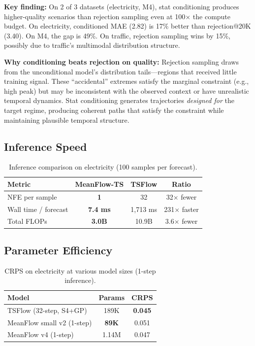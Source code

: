 \documentclass{article}
\begin{document}
\textbf{Key finding:} On 2 of 3 datasets (electricity, M4), stat conditioning produces higher-quality scenarios than rejection sampling even at 100$\times$ the compute budget. On electricity, conditioned MAE (2.82) is 17\% better than rejection@20K (3.40). On M4, the gap is 49\%. On traffic, rejection sampling wins by 15\%, possibly due to traffic's multimodal distribution structure.

\textbf{Why conditioning beats rejection on quality:} Rejection sampling draws from the unconditional model's distribution tails---regions that received little training signal. These ``accidental'' extremes satisfy the marginal constraint (e.g., high peak) but may be inconsistent with the observed context or have unrealistic temporal dynamics. Stat conditioning generates trajectories \emph{designed for} the target regime, producing coherent paths that satisfy the constraint while maintaining plausible temporal structure.

\subsection{Inference Speed}

\begin{table}[h]
\centering
\caption{Inference comparison on electricity (100 samples per forecast).}
\begin{tabular}{lccc}
\toprule
Metric & MeanFlow-TS & TSFlow & Ratio \\
\midrule
NFE per sample & \textbf{1} & 32 & 32$\times$ fewer \\
Wall time / forecast & \textbf{7.4 ms} & 1,713 ms & 231$\times$ faster \\
Total FLOPs & \textbf{3.0B} & 10.9B & 3.6$\times$ fewer \\
\bottomrule
\end{tabular}
\end{table}

\subsection{Parameter Efficiency}

\begin{table}[h]
\centering
\caption{CRPS on electricity at various model sizes (1-step inference).}
\begin{tabular}{lcc}
\toprule
Model & Params & CRPS \\
\midrule
TSFlow (32-step, S4+GP) & 189K & \textbf{0.045} \\
MeanFlow small v2 (1-step) & \textbf{89K} & 0.051 \\
MeanFlow v4 (1-step) & 1.14M & 0.047 \\
\bottomrule
\end{tabular}
\end{table}
\end{document}
